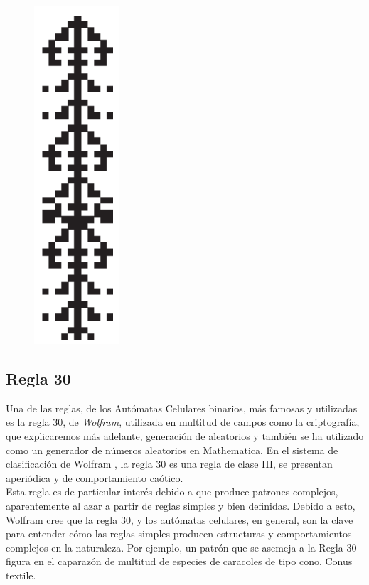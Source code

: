 \begin{figure}[H]
\centering
\includegraphics[scale=0.7]{imagenes/ejemplo_3.png}
\end{figure}


\subsection{Regla 30}
Una de las reglas, de los Autómatas Celulares binarios, más famosas y utilizadas es la regla 30, de \textit{Wolfram}, utilizada en multitud de campos como la criptografía, que explicaremos más adelante, generación de aleatorios  y también se ha utilizado como un generador de números aleatorios en Mathematica. En el  sistema de clasificación de Wolfram , la regla 30 es una regla de clase III, se presentan aperiódica y de comportamiento caótico.\\

Esta regla es de particular interés debido a que produce patrones complejos, aparentemente al azar a partir de reglas simples y bien definidas. Debido a esto, Wolfram cree que la regla 30, y los autómatas celulares, en general, son la clave para entender cómo las reglas simples producen estructuras y comportamientos complejos en la naturaleza. Por ejemplo, un patrón que se asemeja a la Regla 30 figura en el caparazón de multitud de especies de caracoles de tipo cono, Conus textile.

